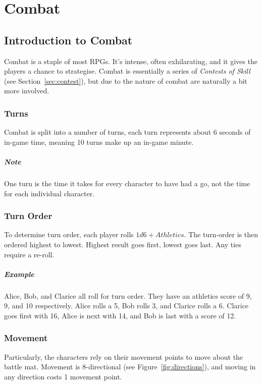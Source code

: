 \chapter{Combat}\label{chap:combat}
\section{Introduction to Combat}
Combat is a staple of most RPGs. 
It's intense, often exhilarating, and it gives the players a chance to strategise.
Combat is essentially a series of \textit{Contests of Skill} (see Section~\ref{sec:contest}), but due to the nature of combat are naturally a bit more involved.
\subsection{Turns}
Combat is split into a number of turns, each turn represents about 6 seconds of in-game time, meaning 10 turns make up an in-game minute.

\paragraph{Note} One turn is the time it takes for every character to have had a go, not the time for each individual character.
\subsection{Turn Order}
To determine turn order, each player rolls $1d6+Athletics$. The turn-order is then ordered highest to lowest. Highest result goes first, lowest goes last. Any ties require a re-roll.

\paragraph{Example} Alice, Bob, and Clarice all roll for turn order. They have an athletics score of 9, 9, and 10 respectively. Alice rolls a 5, Bob rolls 3, and Clarice rolls a 6. Clarice goes first with 16, Alice is next with 14, and Bob is last with a score of 12.

\subsection{Movement}\label{sec:movement}
Particularly, the characters rely on their movement points to move about the battle mat.
Movement is 8-directional (see Figure~\ref{fig:directions}), and moving in any direction costs 1 movement point.

